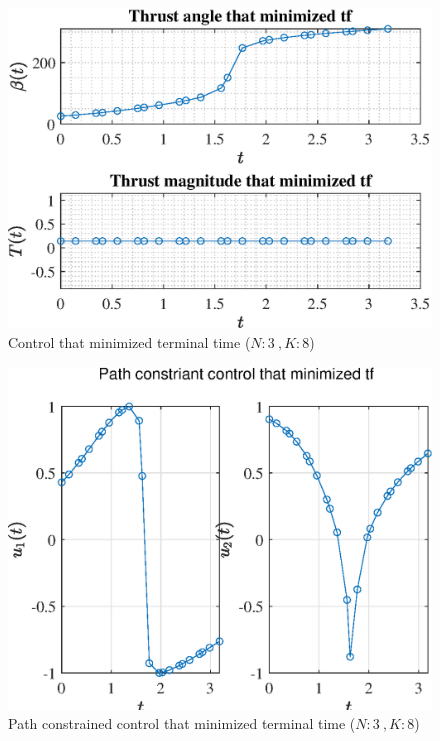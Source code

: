 \documentclass[]{article}
\begin{document}
	\begin{figure}
		\centering
		\includegraphics[scale=0.75]{control_N3_K8_C3_tf.eps}
		\caption{Control that minimized terminal time (\(N:3\ , K:8\))}
		\label{fig:control_N3_K8_C3_tf}
	\end{figure}
	\begin{figure}
		\centering
		\includegraphics[scale=0.75]{path_N3_K8_C3_tf.eps}
		\caption{Path constrained control that minimized terminal time (\(N:3\ , K:8\))}
		\label{fig:path_N3_K8_C3_tf}
	\end{figure}
\end{document}
